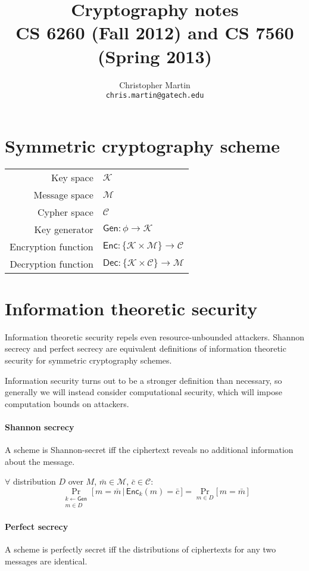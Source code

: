 \documentclass[11pt]{article}
\date{}
\title{Cryptography notes\\CS 6260 (Fall 2012) and CS 7560 (Spring 2013)}
\author{Christopher Martin\\{\tt chris.martin@gatech.edu}}
\newcommand{\Gen}{\ensuremath{\mathsf{Gen}}}
\newcommand{\Enc}{\ensuremath{\mathsf{Enc}}}
\newcommand{\Dec}{\ensuremath{\mathsf{Dec}}}
\newcommand{\K}{\ensuremath{\mathcal{K}}}
\newcommand{\M}{\ensuremath{\mathcal{M}}}
\newcommand{\C}{\ensuremath{\mathcal{C}}}
\theoremstyle{remark}
\begin{document}
\maketitle

\section{Symmetric cryptography scheme}

\begin{tabular}{r|l}
Key space & \K{} \\
Message space & \M{} \\
Cypher space & \C{} \\
Key generator & $\Gen : \phi \rightarrow \K$ \\
Encryption function & $\Enc : \{ \K \times \M \} \rightarrow \C$ \\
Decryption function & $\Dec : \{ \K \times \C \} \rightarrow \M$
\end{tabular}

\section{Information theoretic security}

Information theoretic security repels even resource-unbounded attackers.
Shannon secrecy and perfect secrecy are equivalent definitions of
information theoretic security for symmetric cryptography schemes.

Information security turns out to be a stronger definition than
necessary, so generally we will instead consider computational security,
which will impose computation bounds on attackers.

\paragraph{Shannon secrecy}
A scheme is Shannon-secret iff the ciphertext reveals no additional
information about the message.

$\forall$ distribution $D$ over $M$, $\bar{m} \in \M$, $\bar{c} \in \C$:
\[ \Pr_{\substack{k \gets \Gen\\m \in D}} \big[\, m = \bar{m} \,\vert\, \Enc_k(m) = \bar{c} \,\big]
 = \Pr_{m\in D} \big[\, m = \bar{m} \,\big] \]

\paragraph{Perfect secrecy}
A scheme is perfectly secret iff the distributions of ciphertexts for any
two messages are identical.
\end{document}
